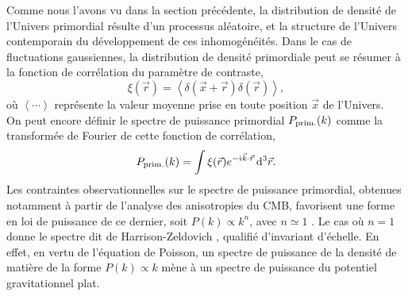 Comme nous l'avons vu dans la section précédente, la distribution de densité de l'Univers primordial résulte d'un processus aléatoire, et la structure de l'Univers contemporain du développement de ces inhomogénéités.
Dans le cas de fluctuations gaussiennes, la distribution de densité primordiale peut se résumer à la fonction de corrélation du paramètre de contraste,
\begin{equation}
    \xi(\vec{r}) = \left< \delta(\vec{x} + \vec{r}) \delta(\vec{r}) \right>,
\end{equation}
où $\left< \cdots \right>$ représente la valeur moyenne prise en toute position $\vec{x}$ de l'Univers. \\
On peut encore définir le spectre de puissance primordial $P_{\rm prim.}(k)$ comme la transformée de Fourier de cette fonction de corrélation,
\begin{equation}
    P_{\rm prim.}(k) = \int \xi(\vec{r}) e^{-i \vec{k} \cdot \vec{r}} \, \mathrm{d}^3 \vec{r}.
\end{equation}
Les contraintes observationnelles sur le spectre de puissance primordial, obtenues notamment à partir de l'analyse des anisotropies du CMB, favorisent une forme en loi de puissance de ce dernier, soit $P(k) \propto k^n$, avec $n \simeq 1$ \cite{planck_collaboration_planck_2020}.
Le cas où $n = 1$ donne le spectre dit de Harrison-Zeldovich \cite{harrison_fluctuations_1970,zeldovich_hypothesis_1972}, qualifié d'invariant d'échelle.
En effet, en vertu de l'équation de Poisson, un spectre de puissance de la densité de matière de la forme $P(k) \propto k$ mène à un spectre de puissance du potentiel gravitationnel plat.


